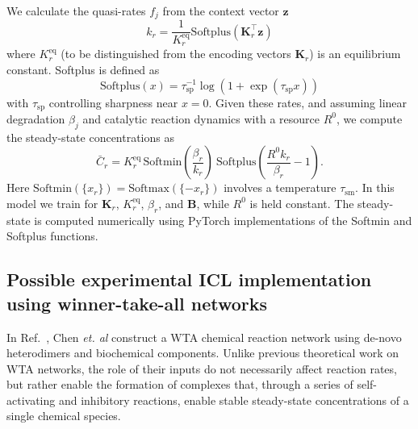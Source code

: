 \documentclass[%
reprint,
superscriptaddress,
amsmath,amssymb,
aps,
]{revtex4-2}
\begin{document}
\begin{onecolumngrid}
		We calculate the quasi-rates $f_j$ from the context vector $\mathbf{z}$
		\begin{equation}
			k_r = \frac{1}{K^\text{eq}_r}\text{Softplus}\left (  \mathbf{K}_r^\intercal\mathbf{z} \right) \label{wtaratekr}
		\end{equation}
		where $K^\text{eq}_r$ (to be distinguished from the encoding vectors $\mathbf{K}_r$) is an equilibrium constant.  Softplus is defined as 
		\begin{equation}
			\text{Softplus}(x) = \tau_\text{sp}^{-1}\log\left(1 + \exp\left(\tau_{\text{sp}} x\right) \right) \label{wtasoftplus}
		\end{equation}
		with $\tau_\text{sp}$ controlling sharpness near $x = 0$.
		Given these rates, and assuming linear degradation $\beta_j$ and catalytic reaction dynamics with a resource $R^0$, we compute the steady-state concentrations as
		\begin{equation}
			\bar{C}_r = K^\text{eq}_r \, \text{Softmin}\left( \frac{\beta_r}{k_r} \right ) \ \text{Softplus} \left ( \frac{R^0 k_r}{\beta_r} - 1 \right ).  \label{wtaCr}
		\end{equation}
		Here $\text{Softmin}(\{x_r\}) = \text{Softmax}(\{-x_r\})$ involves a temperature $\tau_\text{sm}$.  In this model we train for $\mathbf{K}_r$, $K^\text{eq}_r$, $\beta_r$, and $\mathbf{B}$, while $R^0$ is held constant.  The steady-state is computed numerically using PyTorch implementations of the Softmin and Softplus functions.  
		
		\subsection{Possible experimental ICL implementation using winner-take-all networks}\label{SI:exp-wta}
		
		In Ref.~, Chen  {\it et. al} construct a WTA chemical reaction network using de-novo heterodimers and biochemical components. Unlike previous theoretical work on WTA networks, the role of their inputs do not necessarily affect reaction rates, but rather enable the formation of complexes that, through a series of self-activating and inhibitory reactions,  enable stable steady-state concentrations of a single chemical species. 
		

\end{onecolumngrid}
\end{document}
